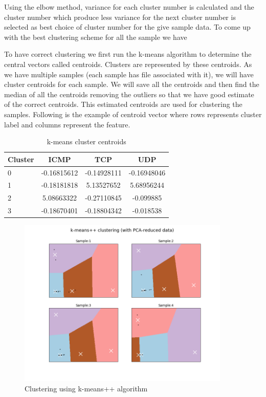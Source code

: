 \documentclass[10pt,oneside,a4paper]{article}
\begin{document}
Using the elbow method, variance for each cluster number is calculated and the cluster number which produce less variance for the next cluster number is selected as best choice of cluster number for the give sample data. To come up with the best clustering scheme for all the sample we have

To have correct clustering we first run the k-means algorithm to determine the central vectors called centroids. Clusters are represented by these centroids. As we have multiple samples (each sample has file associated with it), we will have cluster centroids for each sample. We will save all the centroids and then find the median of all the centroids removing the outliers so that we have good estimate of the correct centroids. This estimated centroids are used for clustering the samples. Following is the example of centroid vector where rows represents cluster label and columns represent the feature.

\begin{table}[h!]
\centering
  \begin{tabular}{ l | c  c  c }
    Cluster      & ICMP  & TCP  & UDP \\
    \hline
    0         &{-0.16815612}       &{-0.14928111}    &{-0.16948046} \\
    1         &{-0.18181818}       &{5.13527652}     &{5.68956244} \\
    2         &{5.08663322}        &{-0.27110845}    &{-0.099885} \\
    3         &{-0.18670401}       &{-0.18804342}    &{-0.018538} \\
  \end{tabular}
\caption{k-means cluster centroids} \label{table:centroids}
\end{table}

\begin{figure}[H]
\centering
\includegraphics[width=0.90\textwidth]{kemans-clustering}
\caption{Clustering using k-means++ algorithm} \label{fig:kmeans-clustering}
\end{figure}
\end{document}
